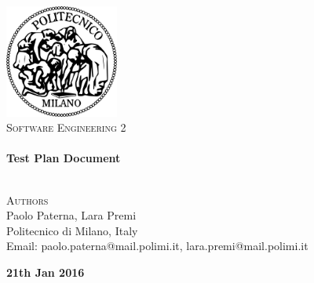 \begin{titlepage}
\begin{center}


~\\[1cm]
\includegraphics[width=0.28\textwidth]{./images/logo-polimi}~\\[1.5cm]

\textsc{\huge \textsc{Software Engineering 2}
}
\\[1cm]

\HRule \\[0.4cm]
{ \huge \bfseries Test Plan Document\\[0.3cm]
		}
\HRule \\[1.5cm]

\noindent
\begin{minipage}{1.0\textwidth}
\begin{center}


\textsc{\large{Authors}} \\
\large{
Paolo Paterna, Lara Premi \\
\vspace{0.8cm}
\small{
Politecnico di Milano, Italy\\
Email: paolo.paterna@mail.polimi.it, lara.premi@mail.polimi.it
}
}

\end{center}
\end{minipage}%

\vfill
\textbf{\large{21th Jan 2016}}

\end{center}
\end{titlepage}